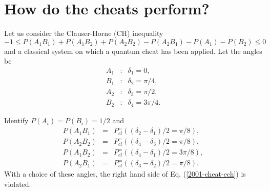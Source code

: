 \section{How do the cheats perform?}

Let us consider the Clauser-Horne (CH) inequality
\begin{equation}
-1\leq P(A_{1}B_{1})+P(A_{1}B_{2})+P(A_{2}B_{2})-P(A_{2}B_{1})-P(A_{1})-P(B_{2}) \leq 0
\label{2001-cheat-ech}
\end{equation}
and a classical system on which a quantum cheat has been applied.
Let the angles be
\begin{eqnarray}
A_{1}&:&\delta_1 = 0,
\nonumber \\
B_{1}&:&\delta_2 = \pi /4,
\nonumber \\
A_{2}&:&\delta_3 = \pi /2,
\nonumber \\
B_{2}&:&\delta_4 = 3\pi /4.
\nonumber
\end{eqnarray}

Identify
$P(A_{i})=P(B_{i})= 1/2$
and
\begin{eqnarray}
P(A_1B_1)&=& P^{=}_{cl}((\delta_2 -\delta_1)/2 = \pi /8),
\nonumber \\
P(A_2B_2)&=& P^{=}_{cl}((\delta_4 -\delta_3)/2 = \pi /8),
\nonumber \\
P(A_1B_2)&=& P^{=}_{cl}((\delta_4 -\delta_1)/2 =3\pi /8),
\nonumber \\
P(A_2B_1)&=& P^{=}_{cl}((\delta_3 -\delta_2)/2 = \pi /8).
\nonumber
\end{eqnarray}
With a choice of these angles, the right hand side of Eq. (\ref{2001-cheat-ech}) is violated.


